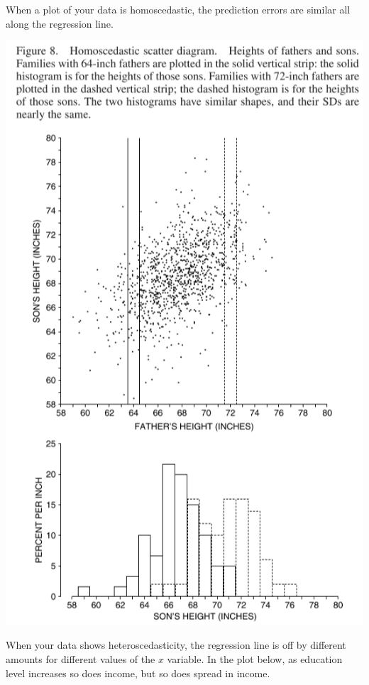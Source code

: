 \documentclass[
]{book}
\begin{document}
When a plot of your data is homoscedastic, the prediction errors are similar all along the regression line.

\includegraphics{images/Ch11Img04.png}

When your data shows heteroscedasticity, the regression line is off by different amounts for different values of the \(x\) variable. In the plot below, as education level increases so does income, but so does spread in income.
\end{document}
